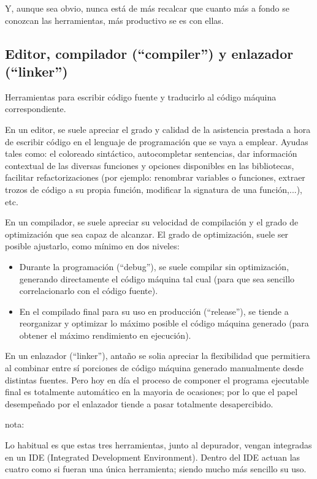 \documentclass[spanish,12pt,a4paper,final,oneside]{book}
\begin{document}
Y, aunque sea obvio, nunca está de más recalcar que cuanto más a fondo se conozcan las herramientas, más productivo se es con ellas.


\subsection{Editor, compilador (``compiler'') y enlazador (``linker'')}
Herramientas para escribir código fuente y traducirlo al código máquina correspondiente.

En un editor, se suele apreciar el grado y calidad de la asistencia prestada a hora de escribir código en el lenguaje de programación que se vaya a emplear. Ayudas tales como: el coloreado sintáctico, autocompletar sentencias, dar información contextual de las diversas funciones y opciones disponibles en las bibliotecas, facilitar refactorizaciones (por ejemplo: renombrar variables o funciones, extraer trozos de código a su propia función, modificar la signatura de una función,...), etc.

En un compilador, se suele apreciar su velocidad de compilación y el grado de optimización que sea capaz de alcanzar. El grado de optimización, suele ser posible ajustarlo, como mínimo en dos niveles:
\begin{itemize}
\item Durante la programación (``debug''), se suele compilar sin optimización, generando directamente el código máquina tal cual (para que sea sencillo correlacionarlo con el código fuente). 
\item En el compilado final para su uso en producción (``release''), se tiende a reorganizar y optimizar lo máximo posible el código máquina generado (para obtener el máximo rendimiento en ejecución).
\end{itemize}

En un enlazador (``linker''), antaño se solia apreciar la flexibilidad que permitiera al combinar entre sí porciones de código máquina generado manualmente desde distintas fuentes. Pero hoy en día el proceso de componer el programa ejecutable final es totalmente automático en la mayoria de ocasiones; por lo que el papel desempeñado por el enlazador tiende a pasar totalmente desapercibido.

\vspace{1cm}
nota:

Lo habitual es que estas tres herramientas, junto al depurador, vengan integradas en un IDE (Integrated Development Environment). Dentro del IDE actuan las cuatro como si fueran una única herramienta; siendo mucho más sencillo su uso.
\end{document}
